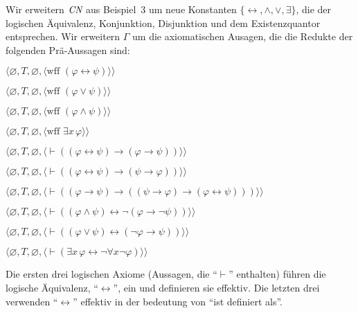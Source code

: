 Wir erweitern $\mbox{\em CN}$ aus Beispiel~3 um neue Konstanten $\{\leftrightarrow, \wedge,\vee,\exists\}$, die der logischen Äquivalenz, Konjunktion, Disjunktion und dem Existenzquantor entsprechen. Wir erweitern $\Gamma$ um die axiomatischen Ausagen, die die Redukte der folgenden Prä-Aussagen sind: 
\begin{list}{}{\itemsep 0.0pt}
      \item[] $\langle\varnothing,T,\varnothing,
               \langle \mbox{wff\ }(\varphi\leftrightarrow\psi)\rangle\rangle$
      \item[] $\langle\varnothing,T,\varnothing,
               \langle \mbox{wff\ }(\varphi\vee\psi)\rangle\rangle$
      \item[] $\langle\varnothing,T,\varnothing,
               \langle \mbox{wff\ }(\varphi\wedge\psi)\rangle\rangle$
      \item[] $\langle\varnothing,T,\varnothing,
               \langle \mbox{wff\ }\exists x\, \varphi\rangle\rangle$
  \item[] $\langle\varnothing,T,\varnothing,
     \langle\vdash ( ( \varphi \leftrightarrow \psi ) \to
     ( \varphi \to \psi ) )\rangle\rangle$
  \item[] $\langle\varnothing,T,\varnothing,
     \langle\vdash ((\varphi\leftrightarrow\psi)\to
    (\psi\to\varphi))\rangle\rangle$
  \item[] $\langle\varnothing,T,\varnothing,
     \langle\vdash ((\varphi\to\psi)\to(
     (\psi\to\varphi)\to(\varphi
     \leftrightarrow\psi)))\rangle\rangle$
  \item[] $\langle\varnothing,T,\varnothing,
     \langle\vdash (( \varphi \wedge \psi ) \leftrightarrow\neg ( \varphi
     \to \neg \psi )) \rangle\rangle$
  \item[] $\langle\varnothing,T,\varnothing,
     \langle\vdash (( \varphi \vee \psi ) \leftrightarrow (\neg \varphi
     \to \psi )) \rangle\rangle$
  \item[] $\langle\varnothing,T,\varnothing,
     \langle\vdash (\exists x \,\varphi\leftrightarrow
     \lnot \forall x \lnot \varphi)\rangle\rangle$
\end{list}
Die ersten drei logischen Axiome (Aussagen, die "`$\vdash$"' enthalten) führen die logische Äquivalenz, "`$\leftrightarrow$"', ein und definieren sie effektiv.  Die letzten drei verwenden "`$\leftrightarrow$"' effektiv in der bedeutung von "`ist definiert als"'. 


